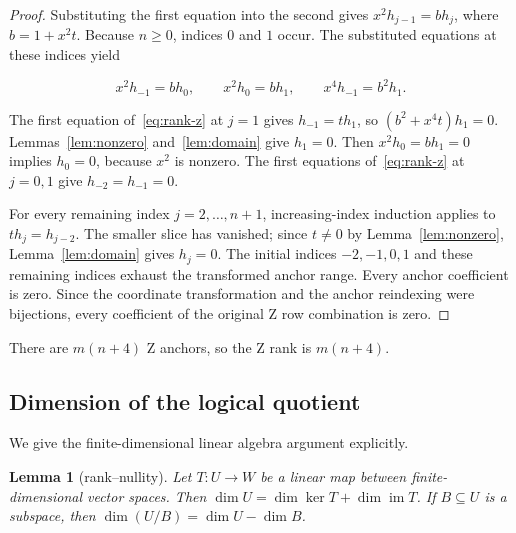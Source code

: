 \documentclass{article}
\newtheorem{lemma}{Lemma}
\begin{document}
\begin{proof}
Substituting the first equation into the second gives
\(x^2h_{j-1}=b h_j\), where \(b=1+x^2t\). Because \(n\ge 0\), indices
\(0\) and \(1\) occur. The substituted equations at these indices yield

\begin{equation}
 x^2h_{-1}=b h_0,
 \qquad x^2h_0=b h_1,
 \qquad x^4h_{-1}=b^2h_1.
\end{equation}

The first equation of~\eqref{eq:rank-z} at \(j=1\) gives \(h_{-1}=t h_1\), so
\((b^2+x^4t)h_1=0\). Lemmas~\ref{lem:nonzero} and~\ref{lem:domain} give \(h_1=0\). Then
\(x^2h_0=b h_1=0\) implies \(h_0=0\), because \(x^2\) is nonzero. The
first equations of~\eqref{eq:rank-z} at \(j=0,1\) give \(h_{-2}=h_{-1}=0\).

For every remaining index \(j=2,\ldots ,n+1\), increasing-index
induction applies to \(t h_j=h_{j-2}\). The smaller slice has vanished;
since \(t\ne 0\) by Lemma~\ref{lem:nonzero}, Lemma~\ref{lem:domain} gives \(h_j=0\). The initial
indices \(-2,-1,0,1\) and these remaining indices exhaust the
transformed anchor range. Every anchor coefficient is zero. Since the
coordinate transformation and the anchor reindexing were bijections,
every coefficient of the original Z row combination is zero.
\end{proof}

There are \(m(n+4)\) Z anchors, so the Z rank is \(m(n+4)\).

\subsection{Dimension of the logical
quotient}\label{dimension-of-the-logical-quotient}

We give the finite-dimensional linear algebra argument explicitly.

\begin{lemma}[rank--nullity]\label{lem:rank-nullity}
Let \(T:U\to W\) be a linear map between
finite-dimensional vector spaces. Then
\(\dim  U=\dim  \ker  T+\dim  \operatorname{im} T\). If \(B\subseteq U\)
is a subspace, then \(\dim (U/B)=\dim  U-\dim  B\).
\end{lemma}
\end{document}
